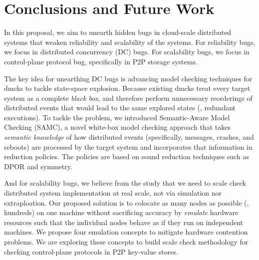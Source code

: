 \chapter{Conclusions and Future Work}
\label{chp-con}




In this proposal, we aim to unearth hidden bugs in cloud-scale distributed
systems that weaken reliability and scalability of the systems. For reliability
bugs, we focus in distributed concurrency (DC) bugs. For scalability bugs, we
focus in control-plane protocol bug, specifically in P2P storage systems.


The key idea for unearthing DC bugs is advancing model checking techniques for
dmcks to tackle state-space explosion. Because existing dmcks treat every target
system as a complete \textit{black box}, and therefore perform unnecessary
reorderings of distributed events that would lead to the same explored states
(\ie, redundant executions).  To tackle the problem, we introduced
Semantic-Aware Model Checking (SAMC), a novel white-box model checking approach
that takes \textit{semantic knowledge} of how distributed events (specifically,
messages, crashes, and reboots) are processed by the target system and
incorporates that information in reduction policies. The policies are based on
sound reduction techniques such as DPOR and symmetry.

And for scalability bugs, we believe from the study that we need to scale check
distributed system implementation at real scale, not via simulation nor
extraploation. Our proposed solution is to colocate as many nodes as possible
(\eg, hundreds) on one machine without sacrificing accuracy by {\em emulate}
hardware resources such that the individual nodes behave as if they run on
independent machines. We propose four emulation concepts to mitigate hardware
contention problems. We are exploring these concepts to build scale check
methodology for checking control-plane protocols in P2P key-value stores.

\fi

